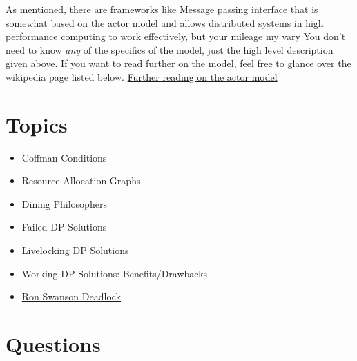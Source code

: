 As mentioned, there are frameworks like \href{https://en.wikipedia.org/wiki/Message\_Passing\_Interface}{Message passing interface} that is somewhat based on the actor model and allows distributed systems in high performance computing to work effectively, but your mileage my vary
You don't need to know \textit{any} of the specifics of the model, just the high level description given above.
If you want to read further on the model, feel free to glance over the wikipedia page listed below.
\href{https://en.wikipedia.org/wiki/Actor\_model}{Further reading on the actor model}

\section{Topics}

\begin{itemize}
  \item Coffman Conditions
  \item Resource Allocation Graphs
  \item Dining Philosophers
  \item Failed DP Solutions
  \item Livelocking DP Solutions
  \item Working DP Solutions: Benefits/Drawbacks
  \item \href{http://adit.io/posts/2013-05-11-The-Dining-Philosophers-Problem-With-Ron-Swanson.html}{Ron Swanson Deadlock}
\end{itemize}

\section{Questions}

